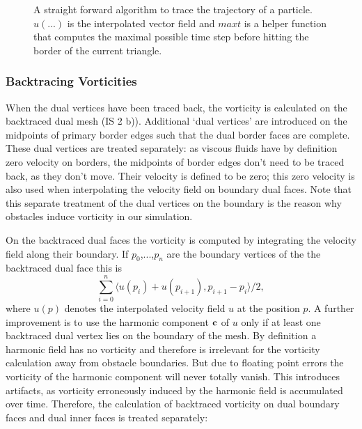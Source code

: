 \begin{figure}
\begin{center}
\end{center}
\caption{A straight forward algorithm to trace  the trajectory of a particle. $u(...)$ is the interpolated vector field and $maxt$ is a helper function that computes the maximal possible time step before hitting the border of the current triangle.}
\label{fig:fd_pathtracing}
\end{figure}

\subsubsection{Backtracing Vorticities}

When the dual vertices have been traced back, the vorticity is calculated on the backtraced dual mesh (IS 2 b)). Additional `dual vertices' are introduced on the midpoints of primary border edges such that the dual border faces are complete. These dual vertices are treated separately: as viscous fluids have by definition zero velocity on borders, the midpoints of border edges don't need to be traced back, as they don't move. Their velocity is defined to be zero; this zero velocity is also used when interpolating the velocity field on boundary dual faces. Note that this separate treatment of the dual vertices on the boundary is the reason why obstacles induce vorticity in our simulation. 

On the backtraced dual faces the vorticity is computed by integrating the velocity field along their boundary. If $p_0$,...,$p_n$ are the boundary vertices of the the backtraced dual face this is
\[\sum_{i=0}^n\langle u(p_i) + u(p_{i+1}), p_{i+1}-p_{i}\rangle/2,\]
where $u(p)$ denotes the interpolated velocity field $u$ at the position $p$. A further improvement is to use the harmonic component $\textbf{c}$ of $u$ only if at least one backtraced  dual vertex lies on the boundary of the mesh. By definition a harmonic field has no vorticity and therefore is irrelevant for the vorticity calculation away from obstacle boundaries. But due to floating point errors the vorticity of the harmonic component will never totally vanish. This introduces artifacts, as vorticity erroneously induced by the harmonic field is accumulated over time. Therefore, the calculation of backtraced vorticity on dual boundary faces and dual inner faces is treated separately:

